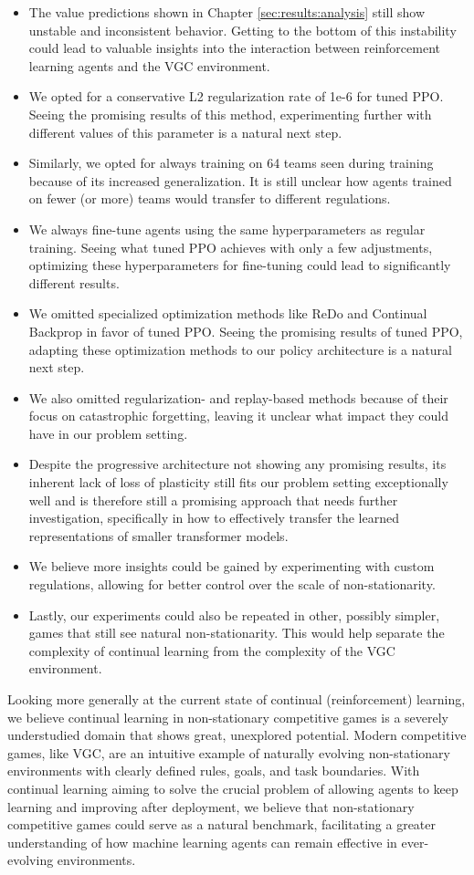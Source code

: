 \begin{itemize}
    \item The value predictions shown in Chapter \ref{sec:results:analysis} still show unstable and inconsistent behavior. Getting to the bottom of this instability could lead to valuable insights into the interaction between reinforcement learning agents and the VGC environment.
    \item We opted for a conservative L2 regularization rate of 1e-6 for tuned PPO. Seeing the promising results of this method, experimenting further with different values of this parameter is a natural next step.
    \item Similarly, we opted for always training on 64 teams seen during training because of its increased generalization. It is still unclear how agents trained on fewer (or more) teams would transfer to different regulations.
    \item We always fine-tune agents using the same hyperparameters as regular training. Seeing what tuned PPO achieves with only a few adjustments, optimizing these hyperparameters for fine-tuning could lead to significantly different results.
    \item We omitted specialized optimization methods like ReDo and Continual Backprop in favor of tuned PPO. Seeing the promising results of tuned PPO, adapting these optimization methods to our policy architecture is a natural next step.
    \item We also omitted regularization- and replay-based methods because of their focus on catastrophic forgetting, leaving it unclear what impact they could have in our problem setting.
    \item Despite the progressive architecture not showing any promising results, its inherent lack of loss of plasticity still fits our problem setting exceptionally well and is therefore still a promising approach that needs further investigation, specifically in how to effectively transfer the learned representations of smaller transformer models.
    \item We believe more insights could be gained by experimenting with custom regulations, allowing for better control over the scale of non-stationarity.
    \item Lastly, our experiments could also be repeated in other, possibly simpler, games that still see natural non-stationarity. This would help separate the complexity of continual learning from the complexity of the VGC environment.
\end{itemize}

Looking more generally at the current state of continual (reinforcement) learning, we believe continual learning in non-stationary competitive games is a severely understudied domain that shows great, unexplored potential.
Modern competitive games, like VGC, are an intuitive example of naturally evolving non-stationary environments with clearly defined rules, goals, and task boundaries.
With continual learning aiming to solve the crucial problem of allowing agents to keep learning and improving after deployment, we believe that non-stationary competitive games could serve as a natural benchmark, facilitating a greater understanding of how machine learning agents can remain effective in ever-evolving environments.
